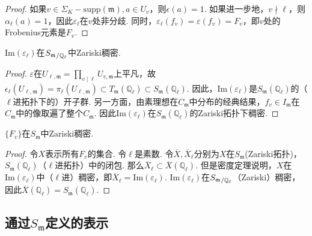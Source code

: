 \begin{proof}
    如果$v\in \Sigma_K - \mathrm{supp}(\mathfrak{m}), a\in U_v$，则$\epsilon(a) = 1$. 如果进一步地，$v\nmid \ell$，则$\alpha_{\ell}(a) = 1$，因此$\varepsilon_{\ell}$在$v$处非分歧. 同时，$\varepsilon_{\ell}(f_v)=\varepsilon(f_v) = F_v$，即$v$处的Frobenius元素是$F_v$.
\end{proof}

\begin{cthm}
    $\mathrm{Im}(\varepsilon_{\ell})$在${S_{\mathfrak{m}}}_{/\mathbb{Q}_{\ell}}$中Zariski稠密.
\end{cthm}

\begin{proof}
    $\varepsilon$在$U_{\ell, \mathfrak{m}} = \prod_{v\mid \ell} U_{v, \mathfrak{m}}$上平凡，故$\epsilon_{\ell}(U_{\ell, \mathfrak{m}}) = \pi_{\ell}(U_{\ell, \mathfrak{m}})\subset T_{\mathfrak{m}}(\mathbb{Q}_{\ell}) \subset S_{\mathfrak{m}}(\mathbb{Q}_{\ell})$. 因此，$\mathrm{Im}(\varepsilon_{\ell})$是$S_{\mathfrak{m}}(\mathbb{Q}_{\ell})$的（$\ell$进拓扑下的）开子群. 另一方面，由素理想在$C_{\mathfrak{m}}$中分布的经典结果，$f_v\in I_{\mathfrak{m}}$在$C_{\mathfrak{m}}$中的像取遍了整个$C_{\mathfrak{m}}$.
    因此$\mathrm{Im}(\varepsilon_{\ell})$在$S_{\mathfrak{m}}(\mathbb{Q}_{\ell})$的Zariski拓扑下稠密.
\end{proof}

\begin{ccor}
    $\{F_v\}$在$S_{\mathfrak{m}}$中Zariski稠密. \label{reps::sm::frob_dense}
\end{ccor}

\begin{proof}
    令$X$表示所有$F_v$的集合. 令$\ell$是素数. 令$\overline{X}, \overline{X}_{\ell}$分别为$X$在$S_{\mathfrak{m}}$(Zariski拓扑)，$S_{\mathfrak{m}}(\mathbb{Q}_{\ell})$（$\ell$进拓扑）中的闭包. 那么$\overline{X}_{\ell}\subset \overline{X}(\mathbb{Q}_{\ell})$. 但是\Chebotarev 密度定理说明，$X$在$\mathrm{Im}(\varepsilon_{\ell})$中（$\ell$进）稠密，即$\overline{X}_{\ell} = \mathrm{Im}(\varepsilon_{\ell})$. $\mathrm{Im}(\varepsilon_{\ell})$在${S_{\mathfrak{m}}}_{/\mathbb{Q}_{\ell}}$（Zariski）稠密，因此$\overline{X}(\mathbb{Q}_{\ell}) = S_{\mathfrak{m}}(\mathbb{Q}_{\ell})$.
\end{proof}

\subsection{通过\texorpdfstring{$S_{\mathfrak{m}}$}{Sm}定义的表示}

